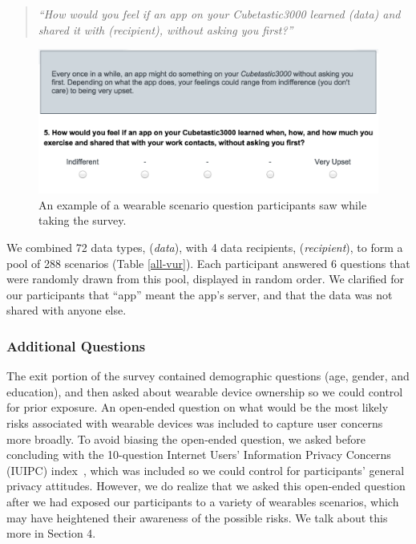 \documentclass[conference]{IEEEtran}
\begin{document}
\begin{quotation}
\noindent
\textit{``How would you feel if an app on your Cubetastic3000 learned (data) and shared it with (recipient), without asking you first?''}
\end{quotation}

\begin{figure}[t]
	\centering
	\includegraphics[width=\columnwidth]{prompt.png}
	\caption{An example of a wearable scenario question participants saw while taking the survey.}
	\label{fig:prompt}
\end{figure}

We combined 72 data types, ({\it data}), with 4 data recipients, ({\it recipient}), to form a pool of 288 scenarios (Table \ref{all-vur}). Each participant answered 6 questions that were randomly drawn from this pool, displayed in random order. We clarified for our participants that ``app'' meant the app's server, and that the data was not shared with anyone else. 

\subsubsection{Additional Questions}
The exit portion of the survey contained demographic questions (age, gender, and education), and then asked about wearable device ownership so we could control for prior exposure. An open-ended question on what would be the most likely risks associated with wearable devices was included to capture user concerns more broadly. To avoid biasing the open-ended question, we asked before concluding with the 10-question Internet Users' Information Privacy Concerns (IUIPC) index~\cite{malhotra2004internet}, which was included so we could control for participants' general privacy attitudes. However, we do realize that we asked this open-ended question after we had exposed our participants to a variety of wearables scenarios, which may have heightened their awareness of the possible risks. We talk about this more in Section 4. 
\end{document}
